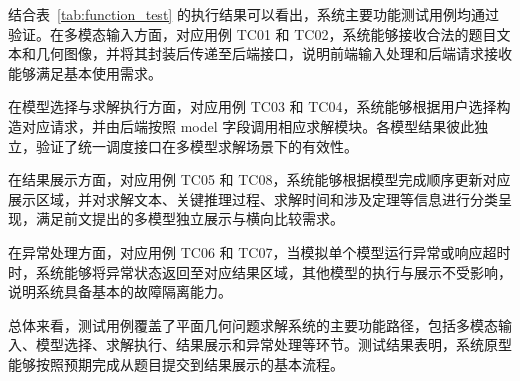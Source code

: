 结合表~\ref{tab:function_test} 的执行结果可以看出，系统主要功能测试用例均通过验证。在多模态输入方面，对应用例 TC01 和 TC02，系统能够接收合法的题目文本和几何图像，并将其封装后传递至后端接口，说明前端输入处理和后端请求接收能够满足基本使用需求。

在模型选择与求解执行方面，对应用例 TC03 和 TC04，系统能够根据用户选择构造对应请求，并由后端按照 model 字段调用相应求解模块。各模型结果彼此独立，验证了统一调度接口在多模型求解场景下的有效性。

在结果展示方面，对应用例 TC05 和 TC08，系统能够根据模型完成顺序更新对应展示区域，并对求解文本、关键推理过程、求解时间和涉及定理等信息进行分类呈现，满足前文提出的多模型独立展示与横向比较需求。

在异常处理方面，对应用例 TC06 和 TC07，当模拟单个模型运行异常或响应超时时，系统能够将异常状态返回至对应结果区域，其他模型的执行与展示不受影响，说明系统具备基本的故障隔离能力。

总体来看，测试用例覆盖了平面几何问题求解系统的主要功能路径，包括多模态输入、模型选择、求解执行、结果展示和异常处理等环节。测试结果表明，系统原型能够按照预期完成从题目提交到结果展示的基本流程。

